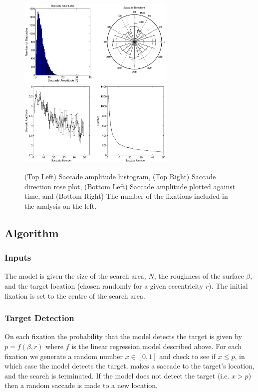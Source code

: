 \begin{figure}
	\centering
		\includegraphics[width=7.5cm]{figures/SaccadeHistandRose.eps}
			\includegraphics[width=7.5cm]{figures/SaccadeAmpOverTime.eps}
	\caption{(Top Left) Saccade amplitude histogram, (Top Right) Saccade direction rose plot, (Bottom Left) Saccade amplitude plotted against time, and (Bottom Right) The number of the fixations included in the analysis on the left.}
	\label{fig:SaccadeStatistics}
\end{figure}


\subsection{Algorithm}

\subsubsection{Inputs}
The model is given the size of the search area, $N$, the roughness of the surface $\beta$, and the target location (chosen randomly for a given eccentricity $r$). The initial fixation is set to the centre of the search area.

\subsubsection{Target Detection}
On each fixation the probability that the model detects the target is given by $p=f(\beta,r)$ where $f$ is the linear regression model described above. For each fixation we generate a random number $x\in[0,1]$ and check to see if $x\leq p$, in which case the model detects the target, makes a saccade to the target's location, and the search is terminated. If the model does not detect the target (i.e. $x>p$) then a random saccade is made to a new location. 

